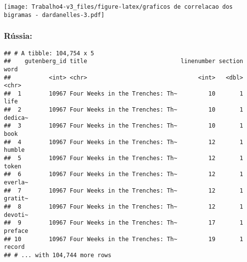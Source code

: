\documentclass[]{article}
\newenvironment{Shaded}{\begin{snugshade}}{\end{snugshade}}
\newcommand{\DataTypeTok}[1]{\textcolor[rgb]{0.13,0.29,0.53}{#1}}
\newcommand{\DecValTok}[1]{\textcolor[rgb]{0.00,0.00,0.81}{#1}}
\newcommand{\KeywordTok}[1]{\textcolor[rgb]{0.13,0.29,0.53}{\textbf{#1}}}
\newcommand{\NormalTok}[1]{#1}
\newcommand{\OperatorTok}[1]{\textcolor[rgb]{0.81,0.36,0.00}{\textbf{#1}}}
\newcommand{\StringTok}[1]{\textcolor[rgb]{0.31,0.60,0.02}{#1}}
\begin{document}
\texttt{[image: Trabalho4-v3\_files/figure-latex/graficos de correlacao dos bigramas - dardanelles-3.pdf]}

\hypertarget{russia-6}{%
\subsubsection{Rússia:}\label{russia-6}}

\begin{Shaded}
\end{Shaded}

\begin{verbatim}
## # A tibble: 104,754 x 5
##    gutenberg_id title                           linenumber section word   
##           <int> <chr>                                <int>   <dbl> <chr>  
##  1        10967 Four Weeks in the Trenches: Th~         10       1 life   
##  2        10967 Four Weeks in the Trenches: Th~         10       1 dedica~
##  3        10967 Four Weeks in the Trenches: Th~         10       1 book   
##  4        10967 Four Weeks in the Trenches: Th~         12       1 humble 
##  5        10967 Four Weeks in the Trenches: Th~         12       1 token  
##  6        10967 Four Weeks in the Trenches: Th~         12       1 everla~
##  7        10967 Four Weeks in the Trenches: Th~         12       1 gratit~
##  8        10967 Four Weeks in the Trenches: Th~         12       1 devoti~
##  9        10967 Four Weeks in the Trenches: Th~         17       1 preface
## 10        10967 Four Weeks in the Trenches: Th~         19       1 record 
## # ... with 104,744 more rows
\end{verbatim}
\end{document}
